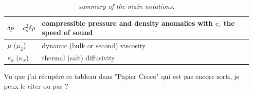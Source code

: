 \documentclass{rapportECC}
\begin{document}
\begin{appendices}
{\begin{table}
\begin{center}
\begin{tabular}{ l l }
$\delta p=c_s^2\delta\rho$  & compressible pressure and density anomalies with $c_s$ the speed of sound \\
\hline
$\mu$ ($\mu_2$)  & dynamic (bulk or second) viscosity  \\
$\kappa_\theta$ ($\kappa_S$) & thermal (salt) diffusivity\\
\hline 
\end{tabular}
\end{center}
\caption{\textit{summary of the main notations.}}
\label{Table_notations}
\end{table}
}
Vu que j'ai récupéré ce tableau dans "Papier Croco" qui est pas encore sorti, je peux le citer ou pas ?

\end{appendices}
\end{document}
